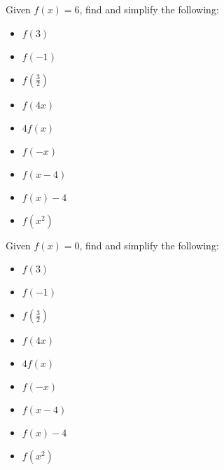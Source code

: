 \documentclass{ximera}
\begin{document}

\begin{problem}
Given $f(x) = 6$,
find and simplify the following:

\begin{itemize}
\item $f(3)$
\item $f(-1)$
\item $f\left(\frac{3}{2} \right)$

\item  $f(4x)$
\item $4f(x)$
\item $f(-x)$

\item  $f(x-4)$
\item $f(x) - 4$
\item  $f\left(x^2\right)$
\end{itemize}
\end{problem}  

 

\begin{problem}\label{funcnotationbasiclast}
Given $f(x) = 0$,
find and simplify the following:

\begin{itemize}
\item $f(3)$
\item $f(-1)$
\item $f\left(\frac{3}{2} \right)$

\item  $f(4x)$
\item $4f(x)$
\item $f(-x)$

\item  $f(x-4)$
\item $f(x) - 4$
\item  $f\left(x^2\right)$
\end{itemize}
\end{problem}  








\end{document}
